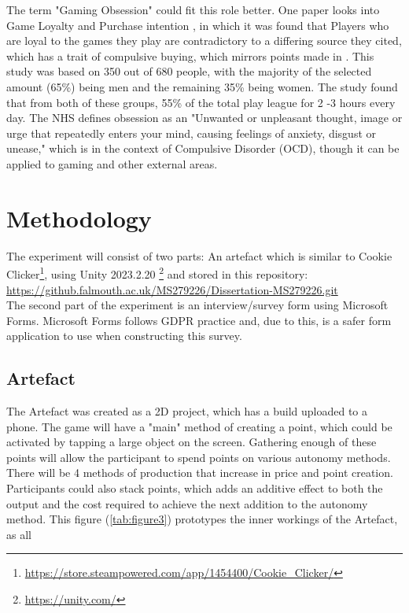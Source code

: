 \documentclass[conference]{IEEEtran}
\begin{document}
The term "Gaming Obsession" could fit this role better. One paper looks into Game Loyalty and Purchase intention \cite{Ramli2022}, in which it was found that Players who are loyal to the games they play are contradictory to a differing source they cited\cite{Widodo2020}, which has a trait of compulsive buying, which mirrors points made in \cite{yasir2021}.  This study was based on 350 out of 680 people, with the majority of the selected amount (65\%) being men and the remaining 35\% being women. The study found that from both of these groups, 55\% of the total play league for 2 -3 hours every day. The NHS  \cite{NHS2021} defines obsession as an "Unwanted or unpleasant thought, image or urge that repeatedly enters your mind, causing feelings of anxiety, disgust or unease," which is in the context of Compulsive Disorder (OCD), though it can be applied to gaming and other external areas.\\

\section{Methodology}
 The experiment will consist of two parts: An artefact which is similar to Cookie Clicker\footnote{\url{https://store.steampowered.com/app/1454400/Cookie_Clicker/}}, using Unity 2023.2.20  \footnote{\url{https://unity.com/}} and stored in this repository:\\

\url{https://github.falmouth.ac.uk/MS279226/Dissertation-MS279226.git}\\

The second part of the experiment is an interview/survey form using Microsoft Forms. Microsoft Forms follows GDPR practice and, due to this, is a safer form application to use when constructing this survey.

\subsection{Artefact}
The Artefact was created as a 2D project, which has a build uploaded to a phone. The game will have a "main" method of creating a point, which could be activated by tapping a large object on the screen. Gathering enough of these points will allow the participant to spend points on various autonomy methods. There will be 4 methods of production that increase in price and point creation. Participants could also stack points, which adds an additive effect to both the output and the cost required to achieve the next addition to the autonomy method. This figure (\ref{tab:figure3}) prototypes the inner workings of the Artefact, as all \\
\end{document}
